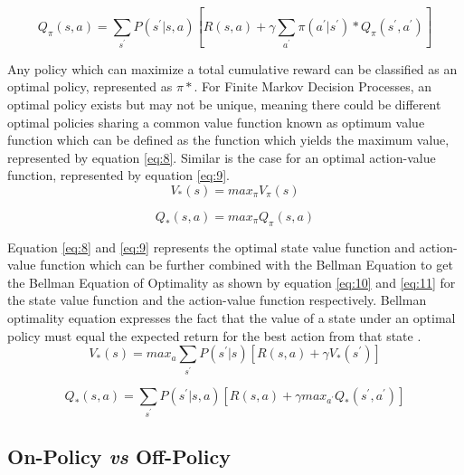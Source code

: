 \begin{equation}\label{eq:7}
    Q_{\pi} (s, a) = \sum_{s^{'}} P(s^{'}|s, a)[R(s, a) + \gamma\sum_{a^{'}} \pi (a^{'}|s^{'}) * Q_{\pi} (s^{'}, a^{'})] 
\end{equation}

Any policy which can maximize a total cumulative reward can be classified as an optimal policy, represented as $\pi *$. For Finite Markov Decision Processes, an optimal policy exists but may not be unique, meaning there could be different optimal policies sharing a common value function known as optimum value function which can be defined as the function which yields the maximum value, represented by equation \ref{eq:8}. Similar is the case for an optimal action-value function, represented by equation \ref{eq:9}. \\

\begin{equation}\label{eq:8}
    V_{*} (s) = max_{\pi} V_{\pi} (s) 
\end{equation}

\begin{equation}\label{eq:9}
    Q_{*} (s, a) = max_{\pi} Q_{\pi} (s, a)
\end{equation}

Equation \ref{eq:8} and \ref{eq:9} represents the optimal state value function and action-value function which can be further combined with the Bellman Equation to get the Bellman Equation of Optimality as shown by equation \ref{eq:10} and \ref{eq:11} for the state value function and the action-value function respectively. Bellman optimality equation expresses the fact that the value of a state under an optimal policy must equal the expected return for the best action from that state \cite{Sutton1998}. \\

\begin{equation}\label{eq:10}
    V_{*} (s) = max_{a} \sum_{s^{'}} P(s^{'}|s)[R(s, a) + \gamma V_{*} (s^{'})]
\end{equation}

\begin{equation}\label{eq:11}
    Q_{*} (s, a) = \sum_{s^{'}} P(s^{'}|s, a)[R(s, a) + \gamma max_{a^{'}} Q_{*} (s^{'}, a^{'})]
\end{equation}

\subsection{On-Policy \textit{vs} Off-Policy}

